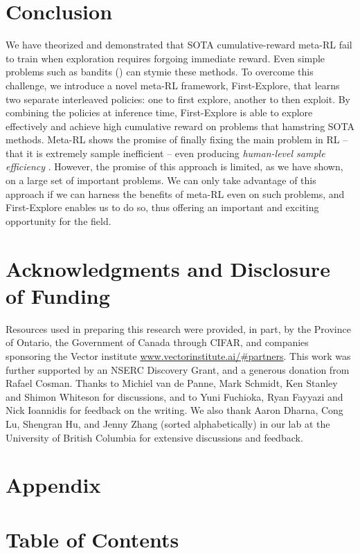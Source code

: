 \documentclass{article}
\begin{document}
\section{Conclusion}
We have theorized and demonstrated that SOTA cumulative-reward meta-RL fail to train when exploration requires forgoing immediate reward. Even simple problems such as bandits () can stymie these methods. To overcome this challenge, we introduce a novel meta-RL framework, First-Explore, that learns two separate interleaved policies: one to first explore, another to then exploit. By combining the policies at inference time, First-Explore is able to explore effectively and achieve high cumulative reward on problems that hamstring SOTA methods.
Meta-RL shows the promise of finally fixing the main problem in RL -- that it is extremely sample inefficient -- even producing \emph{human-level sample efficiency} \citep{adaptiveagentteam2023humantimescale}. However, the promise of this approach is limited, as we have shown, on a large set of important problems. We can only take advantage of this approach if we can harness the benefits of meta-RL even on such problems, and First-Explore enables us to do so, thus offering an important  and exciting opportunity for the field.
\pagebreak
\section*{Acknowledgments and Disclosure of Funding}
Resources used in preparing this research were provided, in part, by the Province of Ontario, the Government of Canada through CIFAR, and companies sponsoring the Vector institute \url{www.vectorinstitute.ai/\#partners}. This work was further supported by an NSERC Discovery Grant, and a generous donation from Rafael Cosman.
Thanks to Michiel van de Panne, Mark Schmidt, Ken Stanley and Shimon Whiteson for discussions, and to Yuni Fuchioka, Ryan Fayyazi and Nick Ioannidis for feedback on the writing. We also thank Aaron Dharna, Cong Lu, Shengran Hu, and Jenny Zhang (sorted alphabetically) in our lab at the University of British Columbia for extensive discussions and feedback.

\pagebreak
\appendix
\pagebreak
\section*{\LARGE \centering Appendix}
\startcontents[appendices]
\section*{Table of Contents}
\vfill
\pagebreak
\end{document}
